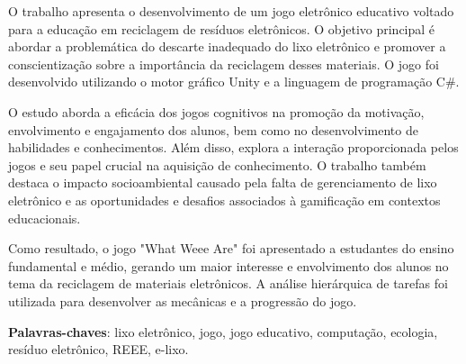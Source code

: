 

\setlength{\absparsep}{18pt} %
\begin{resumo}

O trabalho apresenta o desenvolvimento de um jogo eletrônico educativo voltado para a educação em reciclagem de resíduos eletrônicos. O objetivo principal é abordar a problemática do descarte inadequado do lixo eletrônico e promover a conscientização sobre a importância da reciclagem desses materiais. O jogo foi desenvolvido utilizando o motor gráfico Unity e a linguagem de programação C\#.

O estudo aborda a eficácia dos jogos cognitivos na promoção da motivação, envolvimento e engajamento dos alunos, bem como no desenvolvimento de habilidades e conhecimentos. Além disso, explora a interação proporcionada pelos jogos e seu papel crucial na aquisição de conhecimento. O trabalho também destaca o impacto socioambiental causado pela falta de gerenciamento de lixo eletrônico e as oportunidades e desafios associados à gamificação em contextos educacionais.

Como resultado, o jogo "What Weee Are" foi apresentado a estudantes do ensino fundamental e médio, gerando um maior interesse e envolvimento dos alunos no tema da reciclagem de materiais eletrônicos. A análise hierárquica de tarefas foi utilizada para desenvolver as mecânicas e a progressão do jogo.

 \textbf{Palavras-chaves}: lixo eletrônico, jogo, jogo educativo, computação, ecologia, resíduo eletrônico, REEE, e-lixo.
\end{resumo}

